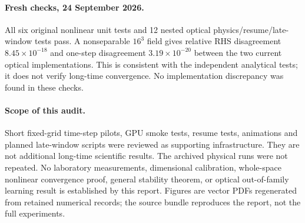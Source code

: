 \documentclass[11pt]{article}
\begin{document}
\paragraph{Fresh checks, 24 September 2026.}
All six original nonlinear unit tests and 12 nested optical physics/resume/late-window tests pass. A nonseparable $16^3$ field gives relative RHS disagreement $8.45\times10^{-18}$ and one-step disagreement $3.19\times10^{-20}$ between the two current optical implementations. This is consistent with the independent analytical tests; it does not verify long-time convergence. No implementation discrepancy was found in these checks.

\paragraph{Scope of this audit.}
Short fixed-grid time-step pilots, GPU smoke tests, resume tests, animations and planned late-window scripts were reviewed as supporting infrastructure. They are not additional long-time scientific results. The archived physical runs were not repeated. No laboratory measurements, dimensional calibration, whole-space nonlinear convergence proof, general stability theorem, or optical out-of-family learning result is established by this report. Figures are vector PDFs regenerated from retained numerical records; the source bundle reproduces the report, not the full experiments.
\end{document}
